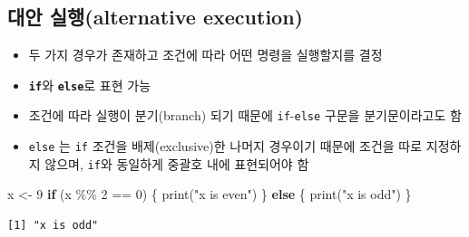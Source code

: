 \documentclass[
  11pt,
]{krantz}
\newenvironment{Shaded}{\begin{snugshade}}{\end{snugshade}}
\newcommand{\ControlFlowTok}[1]{\textcolor[rgb]{0.27,0.27,0.27}{\textbf{#1}}}
\newcommand{\DecValTok}[1]{\textcolor[rgb]{0.06,0.06,0.06}{#1}}
\newcommand{\FunctionTok}[1]{\textcolor[rgb]{0,0,0}{#1}}
\newcommand{\NormalTok}[1]{#1}
\newcommand{\OtherTok}[1]{\textcolor[rgb]{0.37,0.37,0.37}{#1}}
\newcommand{\SpecialCharTok}[1]{\textcolor[rgb]{0,0,0}{#1}}
\newcommand{\StringTok}[1]{\textcolor[rgb]{0.5,0.5,0.5}{#1}}
\providecommand{\tightlist}{%
  \setlength{\itemsep}{0pt}\setlength{\parskip}{0pt}}
\begin{document}
\normalsize

\hypertarget{if-else}{%
\subsection*{\texorpdfstring{\textbf{대안 실행(alternative execution)}}{대안 실행(alternative execution)}}\label{if-else}}


\begin{itemize}
\tightlist
\item
  두 가지 경우가 존재하고 조건에 따라 어떤 명령을 실행할지를 결정
\item
  \textbf{\texttt{if}}와 \textbf{\texttt{else}}로 표현 가능
\item
  조건에 따라 실행이 분기(branch) 되기 때문에 \texttt{if}-\texttt{else} 구문을 분기문이라고도 함
\item
  \texttt{else} 는 \texttt{if} 조건을 배제(exclusive)한 나머지 경우이기 때문에 조건을 따로 지정하지 않으며, \texttt{if}와 동일하게 중괄호 내에 표현되어야 함
\end{itemize}

\footnotesize

\begin{Shaded}
\begin{Highlighting}[]
\NormalTok{x }\OtherTok{\textless{}{-}} \DecValTok{9}
\ControlFlowTok{if}\NormalTok{ (x }\SpecialCharTok{\%\%} \DecValTok{2} \SpecialCharTok{==} \DecValTok{0}\NormalTok{) \{}
  \FunctionTok{print}\NormalTok{(}\StringTok{"x is even"}\NormalTok{)}
\NormalTok{\} }\ControlFlowTok{else}\NormalTok{ \{}
  \FunctionTok{print}\NormalTok{(}\StringTok{"x is odd"}\NormalTok{)}
\NormalTok{\}}
\end{Highlighting}
\end{Shaded}

\begin{verbatim}
[1] "x is odd"
\end{verbatim}

\normalsize

\footnotesize
\end{document}
